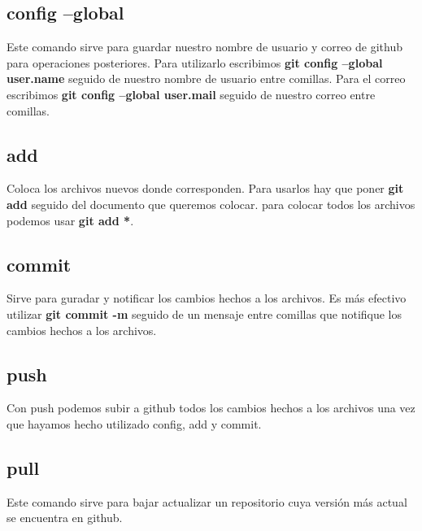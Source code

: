 \documentclass[letterpaper, 12pt, oneside]{article}%
\begin{document}
	\subsection{config --global}
	{Este comando sirve para guardar nuestro nombre de usuario y correo de github para operaciones posteriores. Para utilizarlo escribimos \textbf{git config --global user.name} seguido de nuestro nombre de usuario entre comillas. Para el correo escribimos \textbf{git config --global user.mail} seguido de nuestro correo entre comillas.}
	\subsection{add}
	{Coloca los archivos nuevos donde corresponden. Para usarlos hay que poner \textbf{git add} seguido del documento que queremos colocar. para colocar todos los archivos podemos usar \textbf{git add *}.}
	\subsection{commit}
	{Sirve para guradar y notificar los cambios hechos a los archivos. Es más efectivo utilizar \textbf{git commit -m} seguido de un mensaje entre comillas que notifique los cambios hechos a los archivos.}
	\subsection{push}
	{Con push podemos subir a github todos los cambios hechos a los archivos una vez que hayamos hecho utilizado config, add y commit.}
	\subsection{pull}
	{Este comando sirve para bajar actualizar un repositorio cuya versión más actual se encuentra en github.}
	

		
\end{document}
